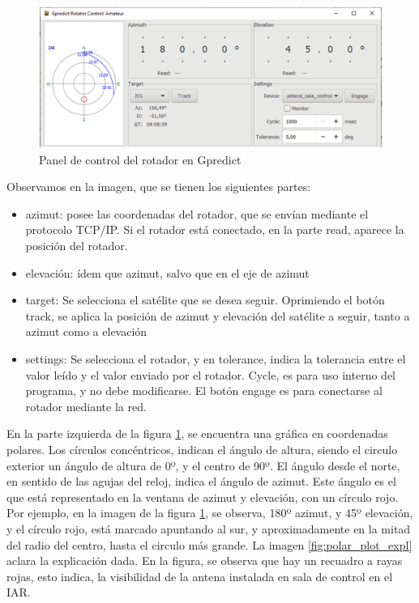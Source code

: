 \begin{figure}[ht]
	\includegraphics{rotador_select}
	\caption{Panel de control del rotador en Gpredict}
	\label{fig:panel_control_gpr}
\end{figure}

Observamos en la imagen, que se tienen los siguientes partes: 

\begin{itemize}	
	\item azimut: posee las coordenadas del rotador, que se envían mediante el protocolo TCP/IP. Si el rotador está conectado, en la parte read, aparece la posición del rotador.  
	\item elevación: ídem que azimut, salvo que en el eje de azimut  
	\item target: Se selecciona el satélite que se desea seguir. Oprimiendo el botón track, se aplica la posición de azimut y elevación del satélite a seguir, tanto a azimut como a elevación 
	\item settings: Se selecciona el rotador, y en tolerance, indica la tolerancia entre el valor leído y el valor enviado por el rotador. Cycle, es para uso interno del programa, y no debe modificarse. El botón engage es para conectarse al rotador mediante la red.   
\end{itemize}


En la parte izquierda de la figura \ref{fig:panel_control_gpr}, se encuentra una gráfica en coordenadas polares. Los círculos concéntricos, indican el ángulo de altura, siendo el circulo exterior un ángulo de altura de 0º, y el centro de 90º. El ángulo desde el norte, en sentido de las agujas del reloj, indica el ángulo de azimut. Este ángulo es el que está representado en la ventana de azimut y elevación, con un círculo rojo. Por ejemplo, en la imagen de la figura \ref{fig:panel_control_gpr}, se observa, 180º azimut, y 45º elevación, y el círculo rojo, está marcado apuntando al sur, y aproximadamente en la mitad del radio del centro, hasta el circulo más grande. La imagen \ref{fig:polar_plot_expl} aclara la explicación dada. En la figura, se observa que hay un recuadro a rayas rojas, esto indica, la visibilidad de la antena instalada en sala de control en el IAR. 


